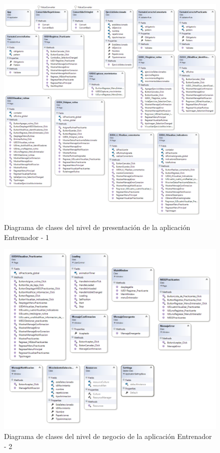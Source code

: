\begin{figure}[H]
	\begin{center}
		\includegraphics[scale=0.55]{./Figuras/Arquitectura/Presentacion_Entrenador1}
	\end{center}
	\caption{Diagrama de clases del nivel de presentación de la aplicación Entrenador - 1}
	\label{fig:DCE_Presentacion1}
\end{figure}

\begin{figure}[H]
	\begin{center}
		\includegraphics[scale=0.65]{./Figuras/Arquitectura/Presentacion_Entrenador2}
	\end{center}
	\caption{Diagrama de clases del nivel de negocio de la aplicación Entrenador - 2}
	\label{fig:DCE_Presentacion2}
\end{figure}

